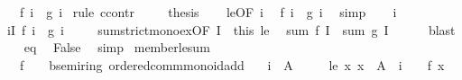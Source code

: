 \begin{isabellebody}
\ \ \ {\isachardoublequoteopen}f\ i\ {\isacharequal}{\kern0pt}\ g\ i{\isachardoublequoteclose}\isanewline
%
\isadelimproof
%
\endisadelimproof
%
\isatagproof
{}\isamarkupfalse%
\ {\isacharparenleft}{\kern0pt}rule\ ccontr{\isacharparenright}{\kern0pt}\isanewline
\ \ \isamarkupfalse%
\ {\isachardoublequoteopen}{\isasymnot}\ {\isacharquery}{\kern0pt}thesis{\isachardoublequoteclose}\isanewline
\ \ \isamarkupfalse%
\ le{\isacharbrackleft}{\kern0pt}OF\ i{\isacharbrackright}{\kern0pt}\ \isamarkupfalse%
\ {\isachardoublequoteopen}f\ i\ {\isacharless}{\kern0pt}\ g\ i{\isachardoublequoteclose}\ \isamarkupfalse%
\ simp\isanewline
\ \ \isamarkupfalse%
\ i\ \isamarkupfalse%
\ {\isachardoublequoteopen}{\isasymexists}i{\isasymin}I{\isachardot}{\kern0pt}\ f\ i\ {\isacharless}{\kern0pt}\ g\ i{\isachardoublequoteclose}\ \isacommand{{\isachardot}{\kern0pt}{\isachardot}{\kern0pt}}\isamarkupfalse%
\isanewline
\ \ \isamarkupfalse%
\ sum{\isacharunderscore}{\kern0pt}strict{\isacharunderscore}{\kern0pt}mono{\isacharunderscore}{\kern0pt}ex{}{\isacharbrackleft}{\kern0pt}OF\ I\ {\isacharunderscore}{\kern0pt}\ this{\isacharbrackright}{\kern0pt}\ le\ \isamarkupfalse%
\ {\isachardoublequoteopen}sum\ f\ I\ {\isacharless}{\kern0pt}\ sum\ g\ I{\isachardoublequoteclose}\isanewline
\ \ \ \ \isamarkupfalse%
\ blast\isanewline
\ \ \isamarkupfalse%
\ eq\ \isamarkupfalse%
\ False\ \isamarkupfalse%
\ simp\isanewline
{}\isamarkupfalse%
%
\endisatagproof
{\isafoldproof}%
%
\isadelimproof
\isanewline
%
\endisadelimproof
\isanewline
{}\isamarkupfalse%
\ member{\isacharunderscore}{\kern0pt}le{\isacharunderscore}{\kern0pt}sum{\isacharcolon}{\kern0pt}\isanewline
\ \ \ f\ {\isacharcolon}{\kern0pt}{\isacharcolon}{\kern0pt}\ {\isachardoublequoteopen}{\isacharunderscore}{\kern0pt}\ {\isasymRightarrow}\ {\isacharprime}{\kern0pt}b{\isacharcolon}{\kern0pt}{\isacharcolon}{\kern0pt}{\isacharbraceleft}{\kern0pt}semiring{\isacharunderscore}{\kern0pt}{}{\isacharcomma}{\kern0pt}\ ordered{\isacharunderscore}{\kern0pt}comm{\isacharunderscore}{\kern0pt}monoid{\isacharunderscore}{\kern0pt}add{\isacharbraceright}{\kern0pt}{\isachardoublequoteclose}\isanewline
\ \ \ {\isachardoublequoteopen}i\ {\isasymin}\ A{\isachardoublequoteclose}\isanewline
\ \ \ \ \ le{\isacharcolon}{\kern0pt}\ {\isachardoublequoteopen}{\isasymAnd}x{\isachardot}{\kern0pt}\ x\ {\isasymin}\ A\ {\isacharminus}{\kern0pt}\ {\isacharbraceleft}{\kern0pt}i{\isacharbraceright}{\kern0pt}\ {\isasymLongrightarrow}\ {}\ {\isasymle}\ f\ x{\isachardoublequoteclose}\isanewline

\end{isabellebody}
